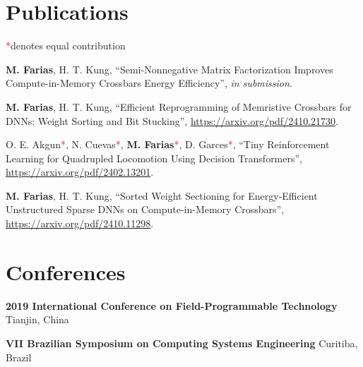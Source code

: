 \documentclass[letterpaper,10pt]{article}
\newcommand{\co}{\textcolor{crimson}{*}}
\begin{document}
\section{Publications}
\co denotes equal contribution
\vspace*{.1cm}
\begin{etaremune}
	\renewcommand{\labelenumi}{[\theenumi]}
    \item \textbf{M. Farias}, H. T. Kung, ``Semi-Nonnegative Matrix Factorization Improves Compute-in-Memory Crossbars Energy Efficiency'', \textit{in submission}.
	\item \textbf{M. Farias}, H. T. Kung, ``Efficient Reprogramming of Memristive Crossbars for DNNs: Weight Sorting and Bit Stucking'', \href{https://arxiv.org/pdf/2410.21730}{https://arxiv.org/pdf/2410.21730}.
    \item O. E. Akgun\co, N. Cuevas\co, \textbf{M. Farias}\co, D. Garces\co, ``Tiny Reinforcement Learning for Quadrupled Locomotion Using Decision Transformers'', \href{https://arxiv.org/pdf/2402.13201}{https://arxiv.org/pdf/2402.13201}.
	\item \textbf{M. Farias}, H. T. Kung, ``Sorted Weight Sectioning for Energy-Efficient Unstructured Sparse DNNs on Compute-in-Memory Crossbars'', \href{https://arxiv.org/pdf/2410.11298}{https://arxiv.org/pdf/2410.11298}.
\end{etaremune}
\vspace*{-.25cm}

\section{Conferences}
\vspace*{.1cm}
\begin{etaremune}
	\item \textbf{2019 International Conference on Field-Programmable Technology}
	\hfill{Tianjin, China}
	\item \textbf{VII Brazilian Symposium on Computing Systems Engineering}
	\hfill{Curitiba, Brazil}
	\end{etaremune}

\vspace*{-.25cm}
\end{document}
